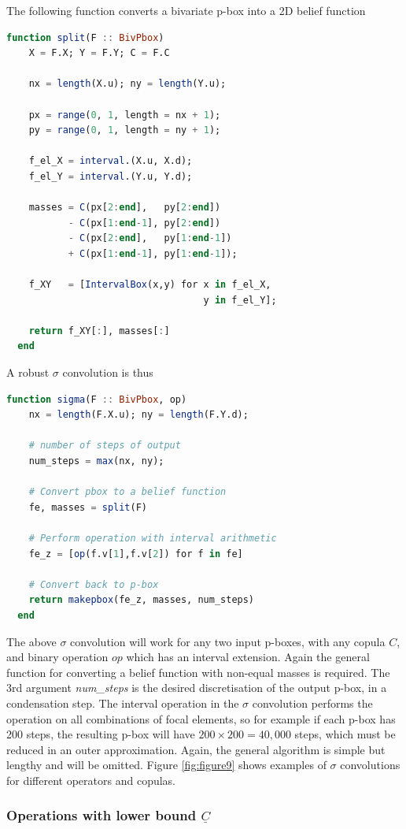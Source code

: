 \documentclass{juliacon}
\begin{document}
The following function converts a bivariate p-box into a 2D belief function
\begin{lstlisting}[language = Julia]
  function split(F :: BivPbox)
    X = F.X; Y = F.Y; C = F.C
    
    nx = length(X.u); ny = length(Y.u);

    px = range(0, 1, length = nx + 1);
    py = range(0, 1, length = ny + 1);

    f_el_X = interval.(X.u, X.d);
    f_el_Y = interval.(Y.u, Y.d);
    
    masses = C(px[2:end],   py[2:end]) 
           - C(px[1:end-1], py[2:end]) 
           - C(px[2:end],   py[1:end-1]) 
           + C(px[1:end-1], py[1:end-1]);

    f_XY   = [IntervalBox(x,y) for x in f_el_X, 
                                   y in f_el_Y];

    return f_XY[:], masses[:]
  end
\end{lstlisting}
\noindent A robust $\sigma$ convolution is thus 
\begin{lstlisting}[language = Julia]
  function sigma(F :: BivPbox, op)
    nx = length(F.X.u); ny = length(F.Y.d);

    # number of steps of output
    num_steps = max(nx, ny);
    
    # Convert pbox to a belief function
    fe, masses = split(F)

    # Perform operation with interval arithmetic
    fe_z = [op(f.v[1],f.v[2]) for f in fe]
    
    # Convert back to p-box
    return makepbox(fe_z, masses, num_steps)
  end
\end{lstlisting}
The above $\sigma$ convolution will work for any two input p-boxes, with any copula $C$, and binary operation $op$ which has an interval extension. Again the general function for converting a belief function with non-equal masses is required. The 3rd argument \textit{num\_steps} is the desired discretisation of the output p-box, in a condensation step. The interval operation in the $\sigma$ convolution performs the operation on all combinations of focal elements, so for example if each p-box has 200 steps, the resulting p-box will have $200 \times 200 = 40,000$ steps, which must be reduced in an outer approximation. Again, the general algorithm is simple but lengthy and will be omitted. Figure \ref{fig:figure9} shows examples of $\sigma$ convolutions for different operators and copulas.
\iffalse
\subsubsection{Operations with lower bound $\underline{C}$}
\end{document}
